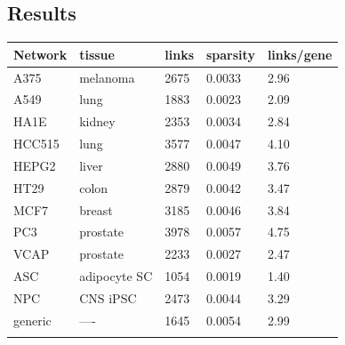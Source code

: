 \documentclass[a0,portrait]{a0poster}
\begin{document}
\begin{multicols}{2}
\section*{Results}
\begin{multicols}{2}
\begin{tabular}{@{}lllll@{}}
\toprule
\textbf{Network} & \textbf{tissue} & \textbf{links} & \textbf{sparsity} & \textbf{links/gene} \\ \midrule
A375 & melanoma & 2675 & 0.0033 & 2.96 \\
A549 & lung & 1883 & 0.0023 & 2.09 \\
HA1E & kidney & 2353 & 0.0034 & 2.84 \\
HCC515 & lung & 3577 & 0.0047 & 4.10 \\
HEPG2 & liver & 2880 & 0.0049 & 3.76 \\
HT29 & colon & 2879 & 0.0042 & 3.47 \\
MCF7 & breast & 3185 & 0.0046 & 3.84 \\
PC3 & prostate & 3978 & 0.0057 & 4.75 \\
VCAP & prostate & 2233 & 0.0027 & 2.47 \\
ASC & adipocyte SC & 1054 & 0.0019 & 1.40 \\
NPC & CNS iPSC & 2473 & 0.0044 & 3.29 \\
generic & ---- & 1645 & 0.0054 & 2.99 \\\bottomrule \\
\end{tabular}



\end{multicols}
\end{multicols}
\end{document}
